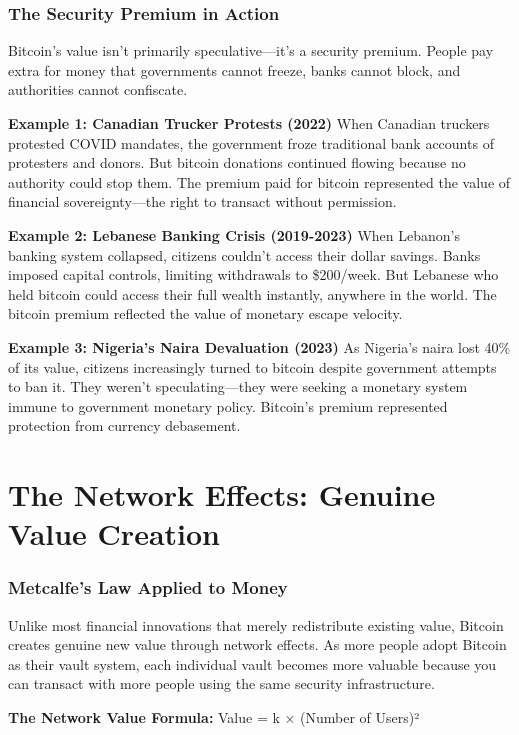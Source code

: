 \documentclass[11pt,oneside]{book}
\begin{document}
\subsubsection{The Security Premium in Action}

Bitcoin's value isn't primarily speculative—it's a security premium. People pay extra for money that governments cannot freeze, banks cannot block, and authorities cannot confiscate.

\textbf{Example 1: Canadian Trucker Protests (2022)}
When Canadian truckers protested COVID mandates, the government froze traditional bank accounts of protesters and donors. But bitcoin donations continued flowing because no authority could stop them. The premium paid for bitcoin represented the value of financial sovereignty—the right to transact without permission.

\textbf{Example 2: Lebanese Banking Crisis (2019-2023)}
When Lebanon's banking system collapsed, citizens couldn't access their dollar savings. Banks imposed capital controls, limiting withdrawals to \$200/week. But Lebanese who held bitcoin could access their full wealth instantly, anywhere in the world. The bitcoin premium reflected the value of monetary escape velocity.

\textbf{Example 3: Nigeria's Naira Devaluation (2023)}
As Nigeria's naira lost 40\% of its value, citizens increasingly turned to bitcoin despite government attempts to ban it. They weren't speculating—they were seeking a monetary system immune to government monetary policy. Bitcoin's premium represented protection from currency debasement.

\section{The Network Effects: Genuine Value Creation}

\subsubsection{Metcalfe's Law Applied to Money}

Unlike most financial innovations that merely redistribute existing value, Bitcoin creates genuine new value through network effects. As more people adopt Bitcoin as their vault system, each individual vault becomes more valuable because you can transact with more people using the same security infrastructure.

\textbf{The Network Value Formula:}
Value = k × (Number of Users)²
\end{document}
